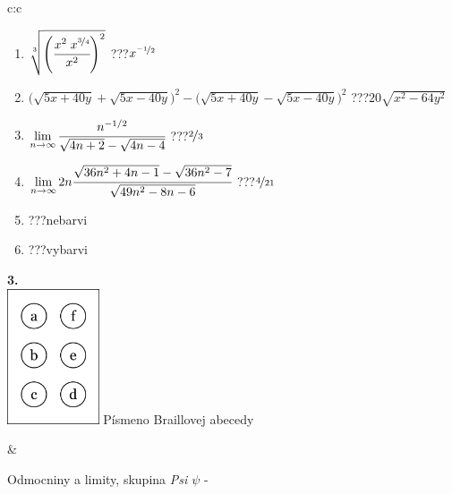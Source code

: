 \documentclass[10pt]{report}
\begin{document}
\begin{tabular}{c:c}
\begin{minipage}[c][104.5mm][t]{0.5\linewidth}
\begin{center}
\begin{minipage}{0.79\linewidth}
\begin{center}
\begin{varwidth}{\linewidth}
\begin{enumerate}
\small
\item $\sqrt[3]{\left(\cfrac{x^{2}\;x^{\nicefrac{3}{4}}}{x^{2}}\right)^{2}}$\quad \dotfill\; ???\;\dotfill \quad $x^{\nicefrac{-1}{2}}$
\item {\footnotesize{\scriptsize$\big(\sqrt{5x+40y}+\sqrt{5x-40y}\big)^2-\big(\sqrt{5x+40y}-\sqrt{5x-40y}\big)^2$}\quad \dotfill\; ???\;\dotfill \quad $20\sqrt{x^2-64y^2}$}
\item $\lim\limits_{n\to\infty}\cfrac{n^{-1/2}}{\sqrt{4n+2}-\sqrt{4n-4}}$\quad \dotfill\; ???\;\dotfill \quad $\nicefrac{2}{3}$
\item $\lim\limits_{n\to\infty}2n\cfrac{\sqrt{36n^2+4n-1}-\sqrt{36n^2-7}}{\sqrt{49n^2-8n-6}}$\quad \dotfill\; ???\;\dotfill \quad $\nicefrac{4}{21}$
\item \quad \dotfill\; ???\;\dotfill \quad nebarvi
\item \quad \dotfill\; ???\;\dotfill \quad vybarvi
\end{enumerate}
\end{varwidth}
\end{center}
\end{minipage}
\begin{minipage}{0.20\linewidth}
\begin{center}
{\Huge\bfseries 3.} \\[2mm]
\includegraphics[height=40mm]{../images/braille.png}
{\small Písmeno Braillovej abecedy}
\end{center}
\end{minipage}
\end{center}
\end{minipage}
&
\begin{minipage}[c][104.5mm][t]{0.5\linewidth}
\begin{center}
\vspace{7mm}
{\huge Odmocniny a limity, skupina \textit{Psi $\psi$} -}\\[5mm]

\end{center}
\end{minipage}
\end{tabular}
\end{document}
